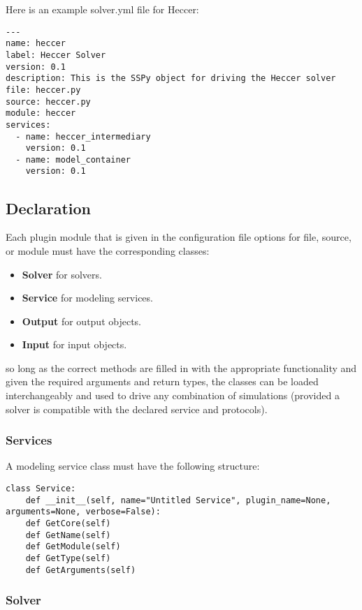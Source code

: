 \documentclass[12pt]{article}
\begin{document}
Here is an example solver.yml file for Heccer:

\begin{verbatim}
---
name: heccer
label: Heccer Solver
version: 0.1
description: This is the SSPy object for driving the Heccer solver
file: heccer.py
source: heccer.py
module: heccer
services:
  - name: heccer_intermediary
    version: 0.1
  - name: model_container
    version: 0.1

\end{verbatim}


\subsection*{Declaration}

Each plugin module that is given in the configuration file options for file, source, or module must have the corresponding classes:

\begin{itemize}
	\item[] {\bf Solver} for solvers.
	\item[] {\bf Service} for modeling services.
	\item[] {\bf Output} for output objects.
	\item[] {\bf Input} for input objects.
\end{itemize}

so long as the correct methods are filled in with the appropriate functionality and given the required arguments and return types,  the classes can be loaded interchangeably and used to drive any combination of simulations (provided a solver is compatible with the declared service and protocols). 

\subsubsection*{Services}

A modeling service class must have the following structure:

\begin{verbatim}
class Service:
	def __init__(self, name="Untitled Service", plugin_name=None, arguments=None, verbose=False):
	def GetCore(self)
	def GetName(self)
	def GetModule(self)
	def GetType(self)
	def GetArguments(self)
\end{verbatim}

\subsubsection*{Solver}
\end{document}
